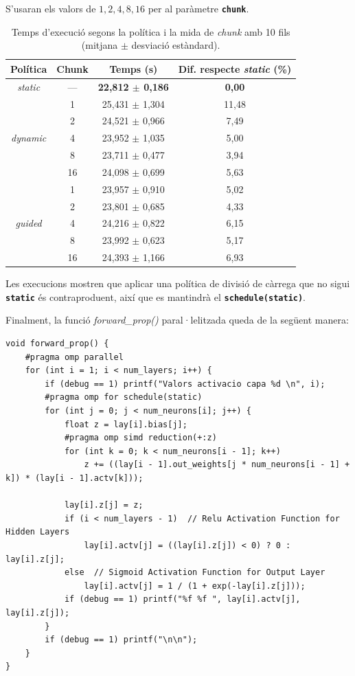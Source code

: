 \documentclass{article}
\begin{document}
S'usaran els valors de $1, 2, 4, 8, 16$ per al paràmetre \textbf{\texttt{chunk}}.

\begin{table}[H]
\centering
\begin{tabular}{|c|c|c|c|}
\hline
\textbf{Política} & \textbf{Chunk} & \textbf{Temps (s)} & \textbf{Dif. respecte \textit{static} (\%)} \\ \hline
\multirow{1}{*}{\textit{static}} & --- & \textbf{22,812 $\pm$ 0,186} & \textbf{0,00} \\ \hline
\multirow{5}{*}{\textit{dynamic}} & 1 & 25,431 $\pm$ 1,304 & 11,48 \\ \cline{2-4}
 & 2 & 24,521 $\pm$ 0,966 & 7,49 \\ \cline{2-4}
 & 4 & 23,952 $\pm$ 1,035 & 5,00 \\ \cline{2-4}
 & 8 & 23,711 $\pm$ 0,477 & 3,94 \\ \cline{2-4}
 & 16 & 24,098 $\pm$ 0,699 & 5,63 \\ \hline
\multirow{5}{*}{\textit{guided}} & 1 & 23,957 $\pm$ 0,910 & 5,02 \\ \cline{2-4}
 & 2 & 23,801 $\pm$ 0,685 & 4,33 \\ \cline{2-4}
 & 4 & 24,216 $\pm$ 0,822 & 6,15 \\ \cline{2-4}
 & 8 & 23,992 $\pm$ 0,623 & 5,17 \\ \cline{2-4}
 & 16 & 24,393 $\pm$ 1,166 & 6,93 \\ \hline
\end{tabular}
\caption{Temps d'execució segons la política i la mida de \textit{chunk} amb 10 fils (mitjana $\pm$ desviació estàndard).}
\label{tab:politiques1}
\end{table}

Les execucions mostren que aplicar una política de divisió de càrrega que no sigui \textbf{\texttt{static}} és contraproduent, així que es mantindrà el \textbf{\texttt{schedule(static)}}.

Finalment, la funció \textit{forward\_prop()} paral·lelitzada queda de la següent manera:
\begin{lstlisting}
void forward_prop() {
    #pragma omp parallel
    for (int i = 1; i < num_layers; i++) {
        if (debug == 1) printf("Valors activacio capa %d \n", i);
        #pragma omp for schedule(static)
        for (int j = 0; j < num_neurons[i]; j++) {
            float z = lay[i].bias[j];
            #pragma omp simd reduction(+:z)
            for (int k = 0; k < num_neurons[i - 1]; k++)
                z += ((lay[i - 1].out_weights[j * num_neurons[i - 1] + k]) * (lay[i - 1].actv[k]));

            lay[i].z[j] = z;
            if (i < num_layers - 1)  // Relu Activation Function for Hidden Layers
                lay[i].actv[j] = ((lay[i].z[j]) < 0) ? 0 : lay[i].z[j];
            else  // Sigmoid Activation Function for Output Layer
                lay[i].actv[j] = 1 / (1 + exp(-lay[i].z[j]));
            if (debug == 1) printf("%f %f ", lay[i].actv[j], lay[i].z[j]);
        }
        if (debug == 1) printf("\n\n");
    }
}
\end{lstlisting}
\end{document}
